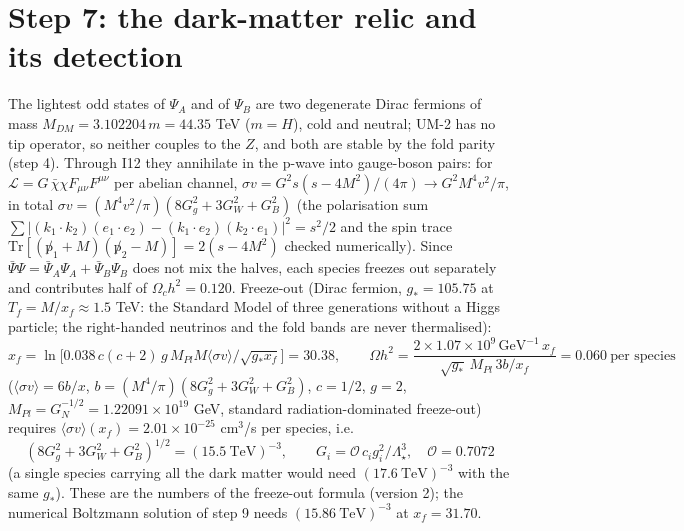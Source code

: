 \documentclass[
  10pt,
]{article}
\begin{document}
\hypertarget{step-7-the-dark-matter-relic-and-its-detection}{%
\section{Step 7: the dark-matter relic and its
detection}\label{step-7-the-dark-matter-relic-and-its-detection}}

The lightest odd states of \(\Psi_A\) and of \(\Psi_B\) are two
degenerate Dirac fermions of mass \(M_{DM} = 3.102204\,m = 44.35\) TeV
(\(m = H\)), cold and neutral; UM-2 has no tip operator, so neither
couples to the \(Z\), and both are stable by the fold parity (step 4).
Through I12 they annihilate in the p-wave into gauge-boson pairs: for
\(\mathcal L = G\,\bar\chi\chi F_{\mu\nu}F^{\mu\nu}\) per abelian
channel, \(\sigma v = G^2s(s - 4M^2)/(4\pi) \to G^2M^4v^2/\pi\), in
total \(\sigma v = (M^4v^2/\pi)(8G_g^2 + 3G_W^2 + G_B^2)\) (the
polarisation sum
\(\sum\lvert(k_1\cdot k_2)(e_1\cdot e_2) - (k_1\cdot e_2)(k_2\cdot e_1)\rvert^2 = s^2/2\)
and the spin trace
\(\mathrm{Tr}[(\not p_1 + M)(\not p_2 - M)] = 2(s - 4M^2)\) checked
numerically). Since
\(\bar\Psi\Psi = \bar\Psi_A\Psi_A + \bar\Psi_B\Psi_B\) does not mix the
halves, each species freezes out separately and contributes half of
\(\Omega_ch^2 = 0.120\). Freeze-out (Dirac fermion, \(g_* = 105.75\) at
\(T_f = M/x_f \approx 1.5\) TeV: the Standard Model of three generations
without a Higgs particle; the right-handed neutrinos and the fold bands
are never thermalised):
\[ x_f = \ln\Big[0.038\,c(c+2)\,g\,M_{Pl}M\langle\sigma v\rangle/\sqrt{g_*x_f}\Big] = 30.38,\qquad \Omega h^2 = \frac{2\times1.07\times10^9\,\text{GeV}^{-1}\,x_f}{\sqrt{g_*}\,M_{Pl}\,3b/x_f} = 0.060\ \text{per species}\]
(\(\langle\sigma v\rangle = 6b/x\),
\(b = (M^4/\pi)(8G_g^2 + 3G_W^2 + G_B^2)\), \(c = 1/2\), \(g = 2\),
\(M_{Pl} = G_N^{-1/2} = 1.22091\times10^{19}\) GeV, standard
radiation-dominated freeze-out) requires
\(\langle\sigma v\rangle(x_f) = 2.01\times10^{-25}\) cm\(^3\)/s per
species, i.e.
\[ (8G_g^2 + 3G_W^2 + G_B^2)^{1/2} = (15.5\ \text{TeV})^{-3},\qquad G_i = \mathcal O\,c_ig_i^2/\Lambda_\star^3,\quad \mathcal O = 0.7072 \]
(a single species carrying all the dark matter would need
\((17.6\ \text{TeV})^{-3}\) with the same \(g_*\)). These are the
numbers of the freeze-out formula (version 2); the numerical Boltzmann
solution of step 9 needs \((15.86\ \text{TeV})^{-3}\) at
\(x_f = 31.70\).
\end{document}
